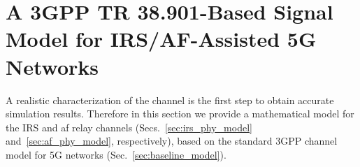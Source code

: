 

 
\section{A 3GPP TR 38.901-Based Signal Model for IRS/AF-Assisted 5G Networks} 
\label{sec:ch_model_ext}


A realistic characterization of the channel is the first step to obtain accurate simulation results. 
Therefore in this section we provide a mathematical model for the IRS and \gls{af} relay channels  (Secs.~\ref{sec:irs_phy_model} and~\ref{sec:af_phy_model}, respectively), based on the standard 3GPP channel model for 5G networks (Sec.~\ref{sec:baseline_model}). %

